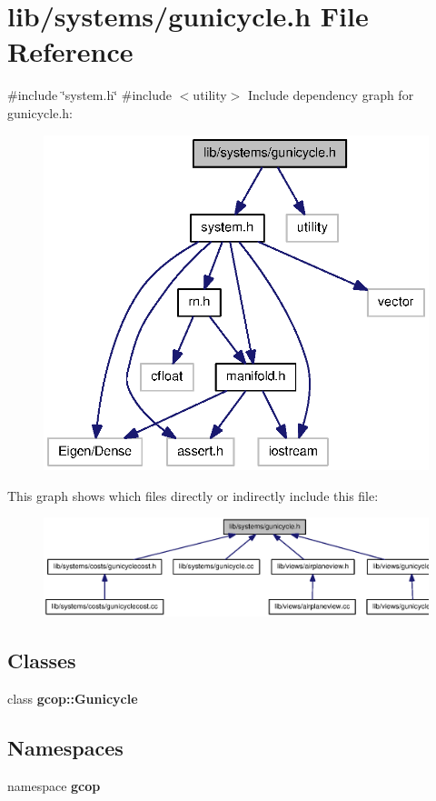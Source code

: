 \section{lib/systems/gunicycle.h \-File \-Reference}
\label{gunicycle_8h}
{\ttfamily \#include \char`\"{}system.\-h\char`\"{}}\*
{\ttfamily \#include $<$utility$>$}\*
\-Include dependency graph for gunicycle.\-h\-:
\nopagebreak
\begin{figure}[H]
\begin{center}
\leavevmode
\includegraphics[width=336pt]{gunicycle_8h__incl}
\end{center}
\end{figure}
\-This graph shows which files directly or indirectly include this file\-:
\nopagebreak
\begin{figure}[H]
\begin{center}
\leavevmode
\includegraphics[width=350pt]{gunicycle_8h__dep__incl}
\end{center}
\end{figure}
\subsection*{\-Classes}
\begin{DoxyCompactItemize}
\item 
class {\bf gcop\-::\-Gunicycle}
\end{DoxyCompactItemize}
\subsection*{\-Namespaces}
\begin{DoxyCompactItemize}
\item 
namespace {\bf gcop}
\end{DoxyCompactItemize}
